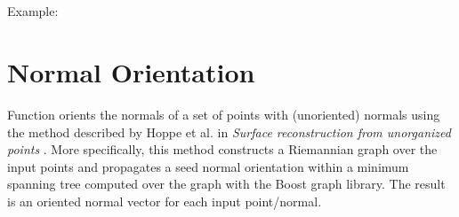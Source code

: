   \\
  \\


Example:



\section{Normal Orientation}

Function  orients the normals of a set of points with (unoriented) normals using the method described by Hoppe et al. in {\em Surface reconstruction from unorganized points} \cite{cgal:hddms-srup-92}. More specifically, this method constructs a Riemannian graph over the input points and propagates a seed normal orientation within a minimum spanning tree computed over the graph with the Boost graph library. The result is an oriented normal vector for each input point/normal.

  \\

